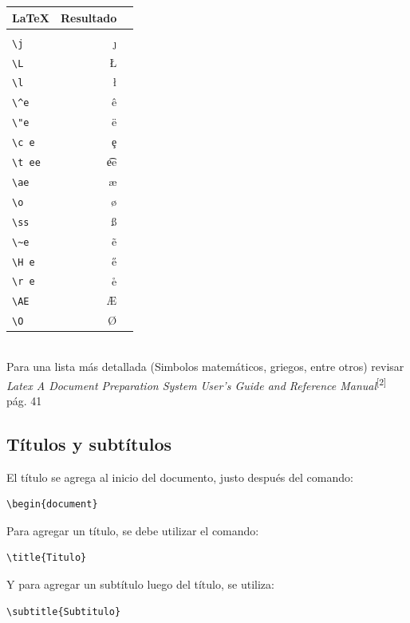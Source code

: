 \documentclass[10pt,journal,compsoc]{IEEEtran}
\begin{document}
\begin{minipage}{0.1\textwidth}
	\begin{tabular}{ l r r }
		\LaTeX & Resultado \\
		\hline\\
		\verb|\j| & \j \\
		\verb|\L| & \L \\
		\verb|\l| & \l \\
		\verb|\^e| & \^e \\
		\verb|\"e| & \"e \\
		\verb|\c e| & \c e \\
		\verb|\t ee|& \t ee \\
		\verb|\ae| & \ae \\
		\verb|\o| & \o \\
		\verb|\ss| & \ss \\
		\verb|\~e| & \~e \\
		\verb|\H e| & \H e \\
		\verb|\r e| & \r e \\
		\verb|\AE| & \AE \\
		\verb|\O|& \O \\
	\end{tabular}
	\hfill
\end{minipage}\\
Para una lista m\'as detallada (Simbolos matem\'aticos, griegos, entre otros) revisar \emph{Latex A Document Preparation System User's Guide and Reference Manual}\textsuperscript{[2]} p\'ag. 41

\subsection{T\'itulos y subt\'itulos}
El t\'itulo se agrega al inicio del documento, justo despu\'es del comando: \\
\begin{lstlisting}
\begin{document}
\end{lstlisting}
Para agregar un t\'itulo, se debe utilizar el comando: \\
\begin{lstlisting}
\title{Titulo}
\end{lstlisting}
Y para agregar un subt\'itulo luego del t\'itulo, se utiliza: \\
\begin{lstlisting}
\subtitle{Subtitulo}
\end{lstlisting}
\end{document}
